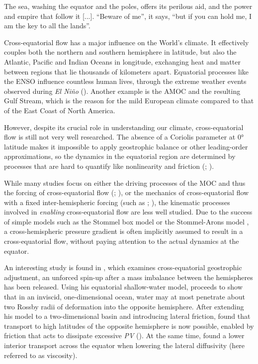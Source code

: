 \setcounter{chapter}{-1}
%
\vspace{-\onelineskip}
%
{The sea, washing the equator and the poles, offers its perilous aid, and the power and empire that follow it [...]. \enquote{Beware of me}, it says, \enquote{but if you can hold me, I am the key to all the lands}.}
\vspace{\onelineskip}

Cross-equatorial flow has a major influence on the World's climate. It effectively couples both the northern and southern hemisphere in latitude, but also the Atlantic, Pacific and Indian Oceans in longitude, exchanging heat and matter between regions that lie thousands of kilometers apart. Equatorial processes like the \acf{ENSO} influence countless human lives, \eg through the extreme weather events observed during \emph{El Ni\~{n}o} (). Another example is the \acf{AMOC} and the resulting Gulf Stream, which is the reason for the mild European climate compared to that of \eg the East Coast of North America.

However, despite its crucial role in understanding our climate, cross-equatorial flow is still not very well researched.
The absence of a Coriolis parameter at \ang{0} latitude makes it impossible to apply geostrophic balance or other leading-order approximations, so the dynamics in the equatorial region are determined by processes that are hard to quantify like nonlinearity and friction (\cite{pedloskyoct}; \cite{edwards}).

While many studies focus on either the driving processes of the \ac{MOC} and thus the forcing of cross-equatorial flow (\cite{kuhlbrodt}; \cite{marshall}), or the mechanics of cross-equatorial flow with a fixed inter-hemispheric forcing (such as \cite{edwards}; \cite{kawase}), the kinematic processes involved in \emph{enabling} cross-equatorial flow are less well studied. Due to the success of simple models such as the Stommel box model \citep{stommelbox} or the Stommel-Arons model \citep{stommel-arons}, a cross-hemispheric pressure gradient is often implicitly assumed to result in a cross-equatorial flow, without paying attention to the actual dynamics at the equator.

An interesting study is found in \cite{killworth}, which examines cross\hyp{}equatorial geostrophic adjustment, \ie an unforced spin-up after a mass imbalance between the hemispheres has been released. Using his equatorial shallow-water model, \citeauthor{killworth} proceeds to show that in an inviscid, one-dimensional ocean, water may at most penetrate about two Rossby radii of deformation into the opposite hemisphere. After extending his model to a two-dimensional basin and introducing lateral friction, \citeauthor{killworth} found that transport to high latitudes of the opposite hemisphere is now possible, enabled by friction that acts to dissipate excessive \emph{\ac{PV}} (). At the same time, \citeauthor{killworth} found a lower interior transport across the equator when lowering the lateral diffusivity (here referred to as viscosity).

